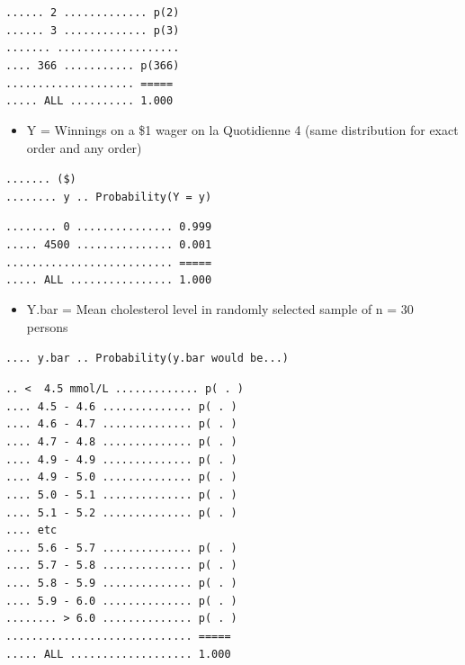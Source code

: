 \documentclass[]{book}
\providecommand{\tightlist}{%
  \setlength{\itemsep}{0pt}\setlength{\parskip}{0pt}}
\begin{document}
\texttt{......\ 2\ .............\ p(2)}\\
\texttt{......\ 3\ .............\ p(3)}~\\
\texttt{.......\ ...................}~\\
\texttt{....\ 366\ ...........\ p(366)}~\\
\texttt{....................\ =====}~\\
\texttt{.....\ ALL\ ..........\ 1.000}

\begin{itemize}
\tightlist
\item
  Y = Winnings on a \$1 wager on la Quotidienne 4
  (same distribution for exact order and any order)
\end{itemize}

\texttt{.......\ (\$)}\\
\texttt{........\ y\ ..\ Probability(Y\ =\ y)}

\texttt{........\ 0\ ...............\ 0.999}~\\
\texttt{.....\ 4500\ ...............\ 0.001}~\\
\texttt{..........................\ =====}~\\
\texttt{.....\ ALL\ ................\ 1.000}

\begin{itemize}
\tightlist
\item
  Y.bar = Mean cholesterol level in randomly selected sample of n = 30 persons
\end{itemize}

\texttt{....\ y.bar\ ..\ Probability(y.bar\ would\ be...)}

\texttt{..\ \textless{}\ \ 4.5\ mmol/L\ .............\ p(\ .\ )}\\
\texttt{....\ 4.5\ -\ 4.6\ ..............\ p(\ .\ )}~\\
\texttt{....\ 4.6\ -\ 4.7\ ..............\ p(\ .\ )}~\\
\texttt{....\ 4.7\ -\ 4.8\ ..............\ p(\ .\ )}~\\
\texttt{....\ 4.9\ -\ 4.9\ ..............\ p(\ .\ )}~\\
\texttt{....\ 4.9\ -\ 5.0\ ..............\ p(\ .\ )}~\\
\texttt{....\ 5.0\ -\ 5.1\ ..............\ p(\ .\ )}~\\
\texttt{....\ 5.1\ -\ 5.2\ ..............\ p(\ .\ )}~\\
\texttt{....\ etc}~\\
\texttt{....\ 5.6\ -\ 5.7\ ..............\ p(\ .\ )}~\\
\texttt{....\ 5.7\ -\ 5.8\ ..............\ p(\ .\ )}~\\
\texttt{....\ 5.8\ -\ 5.9\ ..............\ p(\ .\ )}~\\
\texttt{....\ 5.9\ -\ 6.0\ ..............\ p(\ .\ )}~\\
\texttt{........\ \textgreater{}\ 6.0\ ..............\ p(\ .\ )}~\\
\texttt{.............................\ =====}~\\
\texttt{.....\ ALL\ ...................\ 1.000}
\end{document}
